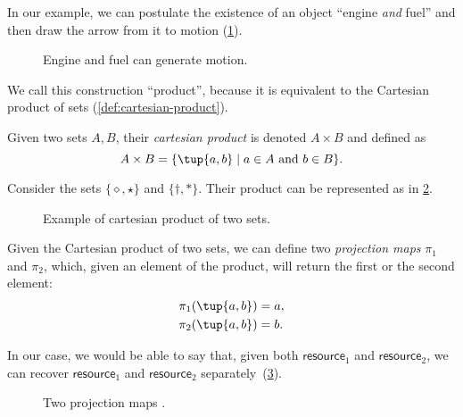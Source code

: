 In our example, we can postulate the existence of an object ``engine \emph{and}
fuel'' and then draw the arrow from it to motion (\cref{fig:e13}).

\begin{figure}[h!]
    \centering
    \caption{Engine and fuel can generate motion. \label{fig:e13}}
\end{figure}

We call this construction ``product'', because it is equivalent to
the Cartesian product of sets (\cref{def:cartesian-product}).

\begin{definition}
\label{def:cartesian-product}
   Given two sets $A,B$, their \emph{cartesian product} is denoted $A\times  B$
   and defined as 
   \begin{equation}
       A\times  B=\{ \tup{a,b}\mid a\in A\text{ and } b\in B\}.
   \end{equation}
\end{definition}

\begin{example}
Consider the sets $\{\diamond,\star\}$ and $\{\dagger, \ast\}$. Their product can be represented as in \cref{fig:cartesian-product}.
\begin{figure}[h!]
    \centering
    \caption{Example of cartesian product of two sets.\label{fig:cartesian-product}}
\end{figure}
\end{example}

\noindent Given the Cartesian product of two sets, we can define two \emph{projection maps} $\pi_1$
and $\pi_2$, which, given an element of the product, will return the first or the second
element:
\begin{equation}
\begin{aligned}
    \pi_1(\tup{a,b}) &= a,\\
    \pi_2(\tup{a,b}) &= b.
\end{aligned}
\end{equation}

In our case, we would be able to say that, given both $\mathsf{resource}_1$ and $\mathsf{resource}_2$,
we can recover $\mathsf{resource}_1$ and $\mathsf{resource}_2$ separately~(\cref{fig:resource-product}).

\begin{figure}[h!]
    \centering
    \caption{Two projection maps \label{fig:resource-product}.}
\end{figure}



